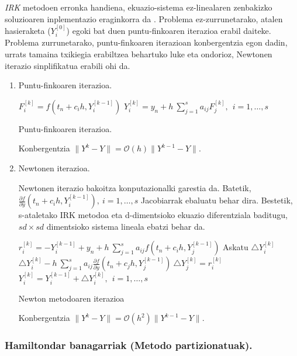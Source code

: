 \emph{IRK} metodoen erronka handiena, ekuazio-sistema ez-linealaren zenbakizko soluzioaren inplementazio eraginkorra da \cite{Hairer2006,SSerna2015b}. Problema ez-zurrunetarako, atalen hasieraketa ($Y_i^{[0]}$) egoki bat duen puntu-finkoaren iterazioa erabil daiteke. Problema zurrunetarako, puntu-finkoaren iterazioan konbergentzia egon dadin, urrats tamaina txikiegia erabiltzea behartuko luke eta ondorioz, Newtonen iterazio sinplifikatua erabili ohi da.  

\begin{enumerate}

\item Puntu-finkoaren iterazioa.

\begin{algorithm}[H]
  {
   $F_{i}^{[k]}=f(t_n+c_ih,Y_i^{[k-1]})$\;
   $Y_{i}^{[k]}=y_{n}+ h \ \sum\limits_{j=1}^{s} a_{ij} F_{j}^{[k]} , \ \  i=1,\dots,s$\; 
  }
 \caption{Puntu-finkoaren iterazioa.}
 \label{alg:rkpf}
\end{algorithm}

Konbergentzia $\|Y^k-Y\|=\mathcal{O}(h) \|Y^{k-1}-Y\|$.


\item Newtonen iterazioa. 

Newtonen iterazio bakoitza konputazionalki garestia da. Batetik,  $\frac{\partial f}{\partial y}(t_n+c_ih,Y_i^{[k-1]}), \ i=1,\dots,s$ Jacobiarrak ebaluatu behar dira. Bestetik, s-ataletako IRK metodoa eta  d-dimentsioko ekuazio diferentziala baditugu, $sd \times sd$ dimentsioko sistema lineala ebatzi behar da.    

\begin{algorithm}[H]
  {
   $r_{i}^{[k]}=-Y_i^{[k-1]}+y_n+h \ \sum\limits_{j=1}^{s} a_{ij} f(t_n+c_ih,Y_j^{[k-1]}) $\;
   Askatu $\triangle Y_i^{[k]}$\;
   $\triangle Y_i^{[k]}-h \ \sum\limits_{j=1}^{s} a_{ij} \frac{\partial f}{\partial y}(t_n+c_jh,Y_j^{[k-1]}) \ \triangle Y_j^{[k]}=r_i^{[k]}$\;
   $Y_i^{[k]}=Y_i^{[k-1]}+\triangle Y_i^{[k]}, \ \  i=1,\dots,s$\; 
  }
 \caption{Newton metodoaren iterazioa}
\end{algorithm}

Konbergentzia $\|Y^k-Y\|=\mathcal{O}(h^2) \|Y^{k-1}-Y\|$.

\end{enumerate}

\subsubsection*{Hamiltondar banagarriak (Metodo partizionatuak).}

